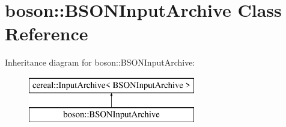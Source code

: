 \hypertarget{classboson_1_1BSONInputArchive}{}\section{boson\+:\+:B\+S\+O\+N\+Input\+Archive Class Reference}
\label{classboson_1_1BSONInputArchive}
Inheritance diagram for boson\+:\+:B\+S\+O\+N\+Input\+Archive\+:\begin{figure}[H]
\begin{center}
\leavevmode
\includegraphics[height=2.000000cm]{classboson_1_1BSONInputArchive}
\end{center}
\end{figure}
